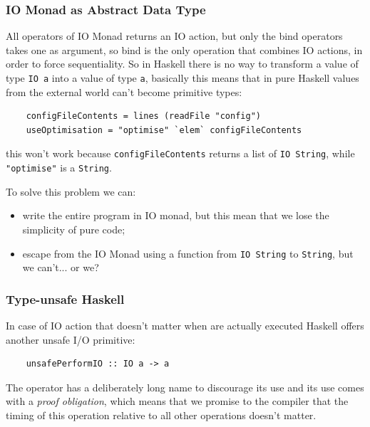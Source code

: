 \subsubsection{IO Monad as Abstract Data Type}
All operators of IO Monad returns an IO action, but only the bind operators takes one as argument, so bind is the only operation that combines IO actions, in order to force sequentiality.
So in Haskell there is no way to transform a value of type \verb|IO a| into a value of type \verb|a|, basically this means that in pure Haskell values from the external world can't become primitive types:
\begin{verbatim}
    configFileContents = lines (readFile "config")
    useOptimisation = "optimise" `elem` configFileContents
\end{verbatim}
this won't work because \verb|configFileContents| returns a list of \verb|IO String|, while \verb|"optimise"| is a \verb|String|.

To solve this problem we can:
\begin{itemize}
    \item write the entire program in IO monad, but this mean that we lose the simplicity of pure code;
    \item escape from the IO Monad using a function from \verb|IO String| to \verb|String|, but we can't... or we?
\end{itemize}

\subsubsection{Type-unsafe Haskell}
In case of IO action that doesn't matter when are actually executed Haskell offers another unsafe I/O primitive:
\begin{verbatim}
    unsafePerformIO :: IO a -> a
\end{verbatim}
The operator has a deliberately long name to discourage its use and its use comes with a \emph{proof obligation}, which means that we promise to the compiler that the timing of this operation relative to all other operations doesn't matter.




